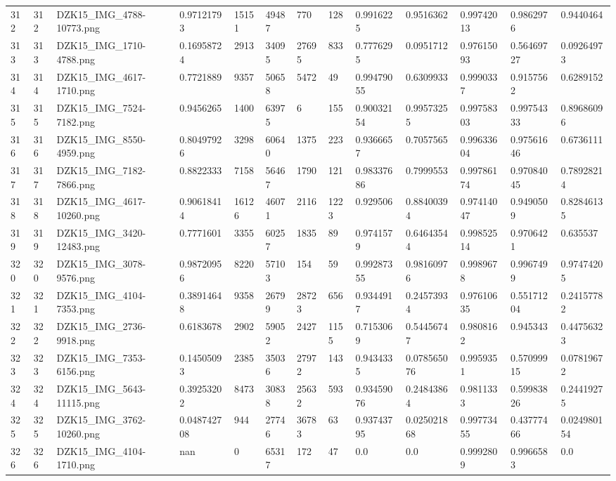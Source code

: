 \documentclass[11pt, a4paper, twoside]{report}
\begin{document}
\begin{longtable}[c]{@{}lllllllllllll@{}}
312 & 312 & DZK15\_IMG\_4788-10773.png & 0.97121793 & 15151 & 49487 & 770 & 128 & 0.9916225 & 0.9516362 & 0.99742013 & 0.9862976 & 0.9440464 \\
313 & 313 & DZK15\_IMG\_1710-4788.png & 0.16958724 & 2913 & 34095 & 27695 & 833 & 0.7776295 & 0.0951712 & 0.97615093 & 0.56469727 & 0.09264973 \\
314 & 314 & DZK15\_IMG\_4617-1710.png & 0.7721889 & 9357 & 50658 & 5472 & 49 & 0.99479055 & 0.6309933 & 0.9990337 & 0.9157562 & 0.6289152 \\
315 & 315 & DZK15\_IMG\_7524-7182.png & 0.9456265 & 1400 & 63975 & 6 & 155 & 0.90032154 & 0.99573255 & 0.99758303 & 0.99754333 & 0.89686096 \\
316 & 316 & DZK15\_IMG\_8550-4959.png & 0.80497926 & 3298 & 60640 & 1375 & 223 & 0.9366657 & 0.7057565 & 0.99633604 & 0.97561646 & 0.6736111 \\
317 & 317 & DZK15\_IMG\_7182-7866.png & 0.8822333 & 7158 & 56467 & 1790 & 121 & 0.98337686 & 0.7999553 & 0.99786174 & 0.97084045 & 0.78928214 \\
318 & 318 & DZK15\_IMG\_4617-10260.png & 0.90618414 & 16126 & 46071 & 2116 & 1223 & 0.929506 & 0.88400394 & 0.97414047 & 0.9490509 & 0.82846135 \\
319 & 319 & DZK15\_IMG\_3420-12483.png & 0.7771601 & 3355 & 60257 & 1835 & 89 & 0.9741579 & 0.64643544 & 0.99852514 & 0.9706421 & 0.635537 \\
320 & 320 & DZK15\_IMG\_3078-9576.png & 0.98720956 & 8220 & 57103 & 154 & 59 & 0.99287355 & 0.98160976 & 0.9989678 & 0.9967499 & 0.97474205 \\
321 & 321 & DZK15\_IMG\_4104-7353.png & 0.38914648 & 9358 & 26799 & 28723 & 656 & 0.9344917 & 0.24573934 & 0.97610635 & 0.55171204 & 0.24157782 \\
322 & 322 & DZK15\_IMG\_2736-9918.png & 0.6183678 & 2902 & 59052 & 2427 & 1155 & 0.7153069 & 0.54456747 & 0.9808162 & 0.945343 & 0.44756323 \\
323 & 323 & DZK15\_IMG\_7353-6156.png & 0.14505093 & 2385 & 35036 & 27972 & 143 & 0.9434335 & 0.078565076 & 0.9959351 & 0.57099915 & 0.07819672 \\
324 & 324 & DZK15\_IMG\_5643-11115.png & 0.39253202 & 8473 & 30838 & 25632 & 593 & 0.93459076 & 0.24843864 & 0.9811333 & 0.59983826 & 0.24419275 \\
325 & 325 & DZK15\_IMG\_3762-10260.png & 0.048742708 & 944 & 27746 & 36783 & 63 & 0.93743795 & 0.025021868 & 0.99773455 & 0.43777466 & 0.024980154 \\
326 & 326 & DZK15\_IMG\_4104-1710.png & nan & 0 & 65317 & 172 & 47 & 0.0 & 0.0 & 0.9992809 & 0.9966583 & 0.0 \\

\end{longtable}
\end{document}
